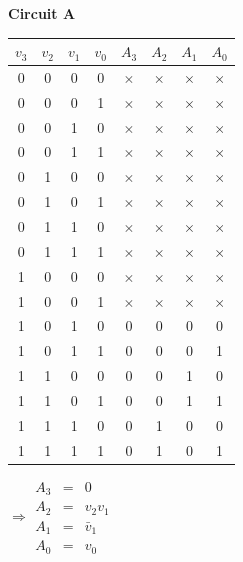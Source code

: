 \documentclass[13pt,a4paper]{report}
\begin{document}
\begin{minipage}[t]{0.5\textwidth}
{\bf \normalsize Circuit A}
\begin{table}[H]
\centering
\begin{tabular}{cccc|cccc}
$v_3$ & $v_2$ & $v_1$ & $v_0$ & $A_3$    & $A_2$    & $A_1$    & $A_0$    \\ \hline
0     & 0     & 0     & 0     & $\times$ & $\times$ & $\times$ & $\times$ \\
0     & 0     & 0     & 1     & $\times$ & $\times$ & $\times$ & $\times$ \\
0     & 0     & 1     & 0     & $\times$ & $\times$ & $\times$ & $\times$ \\
0     & 0     & 1     & 1     & $\times$ & $\times$ & $\times$ & $\times$ \\
0     & 1     & 0     & 0     & $\times$ & $\times$ & $\times$ & $\times$ \\
0     & 1     & 0     & 1     & $\times$ & $\times$ & $\times$ & $\times$ \\
0     & 1     & 1     & 0     & $\times$ & $\times$ & $\times$ & $\times$ \\
0     & 1     & 1     & 1     & $\times$ & $\times$ & $\times$ & $\times$ \\
1     & 0     & 0     & 0     & $\times$ & $\times$ & $\times$ & $\times$ \\
1     & 0     & 0     & 1     & $\times$ & $\times$ & $\times$ & $\times$ \\
1     & 0     & 1     & 0     & 0        & 0        & 0        & 0        \\
1     & 0     & 1     & 1     & 0        & 0        & 0        & 1        \\
1     & 1     & 0     & 0     & 0        & 0        & 1        & 0        \\
1     & 1     & 0     & 1     & 0        & 0        & 1        & 1        \\
1     & 1     & 1     & 0     & 0        & 1        & 0        & 0        \\
1     & 1     & 1     & 1     & 0        & 1        & 0        & 1       
\end{tabular}

$\Rightarrow \begin{array}{rcl}
A_3 & = & 0 \\
A_2 & = & v_2v_1 \\
A_1 & = & \bar v_1\\
A_0 & = & v_0
\end{array}$
\end{table}
\end{minipage}
\end{document}
